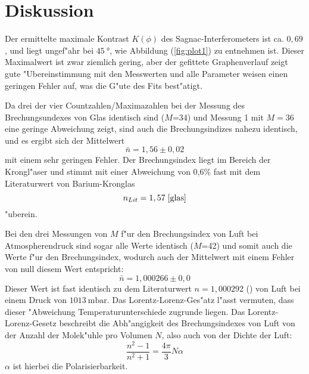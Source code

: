 \section{Diskussion}
\label{sec:Diskussion}

  Der ermittelte maximale Kontrast $K(\phi)$ des Sagnac-Interferometers ist ca. $0,69$, und liegt ungef"ahr bei $\SI{45}{\degree}$, wie Abbildung (\ref{fig:plot1}) zu entnehmen ist.
  Dieser Maximalwert ist zwar ziemlich gering, aber der gefittete Graphenverlauf zeigt gute "Ubereinstimmung mit den Messwerten und alle Parameter weisen einen geringen Fehler auf, was die G"ute des Fits best"atigt.


  Da drei der vier Countzahlen/Maximazahlen bei der Messung des Brechungsundexes von Glas identisch sind ($M$=34) und Messung 1 mit $M=36$ eine geringe Abweichung zeigt, sind auch die Brechungsindizes nahezu identisch, und es ergibt sich der Mittelwert
  \begin{equation}
    \bar{n}=1,56 \pm 0,02
  \end{equation}
  mit einem sehr geringen Fehler.
  Der Brechungsindex liegt im Bereich der Krongl"aser und stimmt mit einer Abweichung von 0,6\% fast mit dem Literaturwert von Barium-Kronglas
  \begin{equation}
    n_{Lit}=1,57 \; \text{\cite{glas}}
  \end{equation}
  "uberein.



  Bei den drei Messungen von $M$ f"ur den Brechungsindex von Luft bei Atmospherendruck sind sogar alle Werte identisch ($M$=42) und somit auch die Werte f"ur den Brechungsindex, wodurch auch der Mittelwert mit einem Fehler von null diesem Wert entspricht:
  \begin{equation}
    \bar{n} = 1,000266 \pm 0,0
  \end{equation}
  Dieser Wert ist fast identisch zu dem Literaturwert $n=1,000292$ (\cite{luft}) von Luft bei einem Druck von $\SI{1013}{\milli \bar}$.
  Das Lorentz-Lorenz-Ges"atz l"asst vermuten, dass dieser "Abweichung Temperaturunterschiede zugrunde liegen.
  Das Lorentz-Lorenz-Gesetz beschreibt die Abh"angigkeit des Brechungsindexes von Luft von der Anzahl der Molek"uhle pro Volumen $N$, also auch von der Dichte der Luft:
  \begin{equation}
    \frac{n^2-1}{n^2+1} = \frac{4\pi}{3}N\alpha
  \end{equation}
  $\alpha$ ist hierbei die Polarisierbarkeit.

